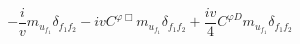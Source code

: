 %
\begin{dmath*}
%
  -  \frac{i}{v}  m_{u_{f_1}} \delta_{f_1 f_2}  -  i v  C^{ \varphi  \Box} m_{u_{f_1}} \delta_{f_1 f_2}  +  \frac{i v}{4}  C^{ \varphi  D} m_{u_{f_1}} \delta_{f_1 f_2}
%
\end{dmath*}
%
